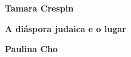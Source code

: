 \textbf{Tamara Crespin} \lipsum[2]

\textbf{A diáspora judaica e o lugar} \lipsum[2]

\textbf{Paulina Cho} \lipsum[2]



